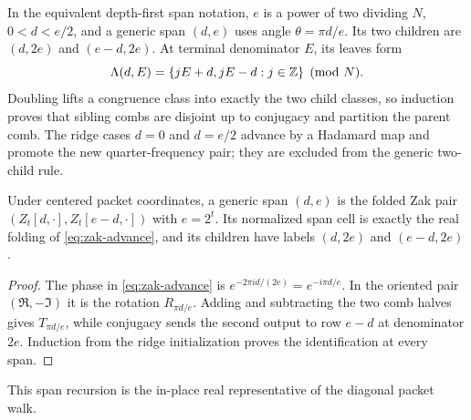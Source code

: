In the equivalent depth-first span notation, $e$ is a power of two dividing
$N$, $0<d<e/2$, and a generic span $(d,e)$ uses angle $\theta=\pi d/e$.  Its two children
are $(d,2e)$ and $(e-d,2e)$.  At terminal denominator $E$, its leaves form
\begin{equation}
 \Lambda(d,E)=\{jE+d,jE-d:j\in\mathbb{Z}\}\pmod N.
 \label{eq:span-comb}
\end{equation}
Doubling lifts a congruence class into exactly the two child classes, so
induction proves that sibling combs are disjoint up to conjugacy and partition
the parent comb.  The ridge cases $d=0$ and $d=e/2$ advance by a Hadamard map
and promote the new quarter-frequency pair; they are excluded from the generic
two-child rule.

\begin{proposition}
Under centered packet coordinates, a generic span $(d,e)$ is the folded Zak
pair $(Z_t[d,\cdot],Z_t[e-d,\cdot])$ with $e=2^t$.  Its normalized span cell is
exactly the real folding of \eqref{eq:zak-advance}, and its children have labels
$(d,2e)$ and $(e-d,2e)$.
\end{proposition}
\begin{proof}
The phase in \eqref{eq:zak-advance} is
$e^{-2\pi id/(2e)}=e^{-i\pi d/e}$.  In the oriented pair
$(\Re,-\Im)$ it is the rotation $R_{\pi d/e}$.  Adding and subtracting the two
comb halves gives $T_{\pi d/e}$, while conjugacy sends the second output to
row $e-d$ at denominator $2e$.  Induction from the ridge initialization proves
the identification at every span.
\end{proof}

This span recursion is the in-place real representative of the diagonal packet
walk.

